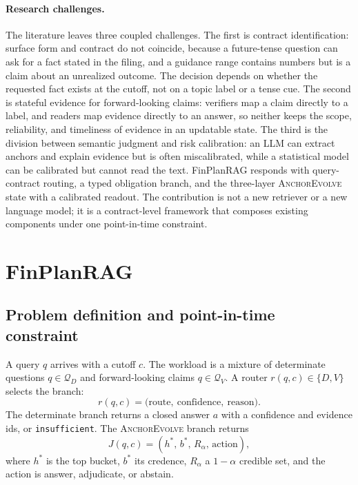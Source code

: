 \documentclass[11pt]{article}
\newcommand{\method}{FinPlanRAG}
\newcommand{\anchor}{\textsc{AnchorEvolve}}
\begin{document}
\paragraph{Research challenges.}
The literature leaves three coupled challenges. The first is contract identification: surface form and contract do not coincide, because a future-tense question can ask for a fact stated in the filing, and a guidance range contains numbers but is a claim about an unrealized outcome. The decision depends on whether the requested fact exists at the cutoff, not on a topic label or a tense cue. The second is stateful evidence for forward-looking claims: verifiers map a claim directly to a label, and readers map evidence directly to an answer, so neither keeps the scope, reliability, and timeliness of evidence in an updatable state. The third is the division between semantic judgment and risk calibration: an LLM can extract anchors and explain evidence but is often miscalibrated, while a statistical model can be calibrated but cannot read the text. \method{} responds with query-contract routing, a typed obligation branch, and the three-layer \anchor{} state with a calibrated readout. The contribution is not a new retriever or a new language model; it is a contract-level framework that composes existing components under one point-in-time constraint.

\section{FinPlanRAG}

\subsection{Problem definition and point-in-time constraint}
A query $q$ arrives with a cutoff $c$. The workload is a mixture of determinate questions $q\in\mathcal Q_D$ and forward-looking claims $q\in\mathcal Q_V$. A router $r(q,c)\in\{D,V\}$ selects the branch:
\begin{equation}
r(q,c)=\bigl(\text{route},\ \text{confidence},\ \text{reason}\bigr).
\end{equation}
The determinate branch returns a closed answer $a$ with a confidence and evidence ids, or \texttt{insufficient}. The \anchor{} branch returns
\begin{equation}
J(q,c)=(h^*,\,b^*,\,R_\alpha,\,\text{action}),
\end{equation}
where $h^*$ is the top bucket, $b^*$ its credence, $R_\alpha$ a $1-\alpha$ credible set, and the action is answer, adjudicate, or abstain.
\end{document}
